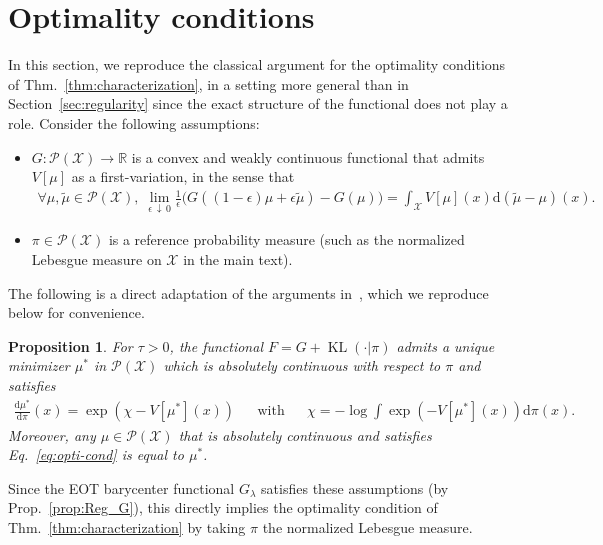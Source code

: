 \documentclass[11pt]{article}
\newcommand{\RR}{\mathbb{R}}
\newcommand{\Pp}{\mathcal{P}}
\newcommand{\Xx}{\mathcal{X}}
\renewcommand{\d}{\mathrm{d}}
\DeclareMathOperator{\KL}{KL}
\newtheorem{proposition}[theorem]{Proposition}
\begin{document}
\section{Optimality conditions}
In this section, we reproduce the classical argument for the optimality conditions of Thm.~\ref{thm:characterization}, in a  setting more general than in Section~\ref{sec:regularity} since the exact structure of the functional does not play a role. Consider the following assumptions:
\begin{itemize}
\item $G:\Pp(\Xx)\to \RR$ is a convex and weakly continuous functional that admits $V[\mu]$ as a first-variation, in the sense that 
\begin{align}
\forall \mu,\tilde \mu \in \Pp(\Xx),\; \lim_{\epsilon\, \downarrow\, 0}\frac{1}{\epsilon} \Big(G((1-\epsilon)\mu+\epsilon \tilde \mu) - G(\mu)\Big) = \int_\Xx V[\mu](x)\d (\tilde \mu-\mu)(x) .
\end{align}
\item $\pi\in \Pp(\Xx)$ is a reference probability measure (such as the normalized Lebesgue measure on $\Xx$ in the main text).
\end{itemize}
The following is a direct adaptation of the arguments in~\cite[Prop.~8.7]{santambrogio2015optimal}, which we reproduce below for convenience.
\begin{proposition}\label{prop:general-min-entropy-pb}
For $\tau>0$, the functional $F=G+ \KL(\cdot|\pi)$ admits a unique minimizer $\mu^*$ in $\Pp(\Xx)$ which is absolutely continuous with respect to $\pi$ and satisfies
\begin{align}\label{eq:opti-cond}
\frac{\d \mu^*}{\d \pi}(x) = \exp(\chi -V[\mu^*](x)) &&\text{with}&& \chi = -\log \int \exp(-V[\mu^*](x))\d\pi(x).
\end{align}
Moreover, any $\mu\in \Pp(\Xx)$ that is absolutely continuous and satisfies Eq.~\eqref{eq:opti-cond} is equal to $\mu^*$.
\end{proposition}
Since the EOT barycenter functional $G_\lambda$ satisfies these assumptions (by Prop.~\ref{prop:Reg_G}), this directly implies the optimality condition of Thm.~\ref{thm:characterization} by taking $\pi$ the normalized Lebesgue measure.
\end{document}
